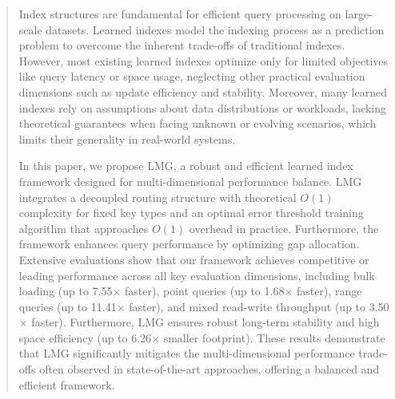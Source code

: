 \begin{abstract}
Index structures are fundamental for efficient query processing on large-scale datasets. Learned indexes model the indexing process as a prediction problem to overcome the inherent trade-offs of traditional indexes. However, most existing learned indexes optimize only for limited objectives like query latency or space usage, neglecting other practical evaluation dimensions such as update efficiency and stability. Moreover, many learned indexes rely on assumptions about data distributions or workloads, lacking theoretical guarantees when facing unknown or evolving scenarios, which limits their generality in real-world systems.

In this paper, we propose LMG, a robust and efficient learned index framework designed for multi-dimensional performance balance. LMG integrates a decoupled routing structure with theoretical $O(1)$ complexity for fixed key types and an optimal error threshold training algorithm that approaches $O(1)$ overhead in practice. Furthermore, the framework enhances query performance by optimizing gap allocation. Extensive evaluations show that our framework achieves competitive or leading performance across all key evaluation dimensions, including bulk loading (up to 7.55$\times$ faster), point queries (up to 1.68$\times$ faster), range queries (up to 11.41$\times$ faster), and mixed read-write throughput (up to 3.50$\times$ faster). Furthermore, LMG ensures robust long-term stability and high space efficiency (up to 6.26$\times$ smaller footprint). These results demonstrate that LMG significantly mitigates the multi-dimensional performance trade-offs often observed in state-of-the-art approaches, offering a balanced and efficient framework.

\end{abstract}





